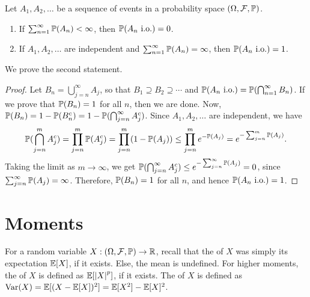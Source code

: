 \begin{lemma}
    Let $A_{1},A_{2},\ldots$ be a sequence of events in a probability space $(\Omega,\mathcal{F},\mathbb{P})$.
    \begin{enumerate}
        \item If $\sum_{n=1}^{\infty} \mathbb{P}(A_{n}) < \infty$, then $\mathbb{P}(A_{n} \text{ i.o.}) = 0$.
        \item If $A_{1},A_{2},\ldots$ are independent and $\sum_{n=1}^{\infty} \mathbb{P}(A_{n}) = \infty$, then $\mathbb{P}(A_{n} \text{ i.o.}) = 1$.
    \end{enumerate}
\end{lemma}
We prove the second statement.
\begin{proof}
    Let $B_{n} = \bigcup_{j=n}^{\infty} A_{j}$, so that $B_{1} \supseteq B_{2} \supseteq \cdots$ and $\mathbb{P}(A_{n} \text{ i.o.}) = \mathbb{P}(\bigcap_{n=1}^{\infty} B_{n})$. If we prove that $\mathbb{P}(B_{n}) = 1$ for all $n$, then we are done. Now, $\mathbb{P}(B_{n}) = 1 - \mathbb{P}(B_{n}^{c}) = 1 - \mathbb{P}(\bigcap_{j=n}^{\infty} A_{j}^{c})$. Since $A_{1},A_{2},\ldots$ are independent, we have
    \begin{align}
        \mathbb{P}(\bigcap_{j=n}^{m} A_{j}^{c}) = \prod_{j=n}^{m} \mathbb{P}(A_{j}^{c}) = \prod_{j=n}^{m} (1 - \mathbb{P}(A_{j})) \leq \prod_{j=n}^{m} e^{-\mathbb{P}(A_{j})} = e^{-\sum_{j=n}^{m} \mathbb{P}(A_{j})}.
    \end{align}
    Taking the limit as $m \to \infty$, we get $\mathbb{P}(\bigcap_{j=n}^{\infty} A_{j}^{c}) \leq e^{-\sum_{j=n}^{\infty} \mathbb{P}(A_{j})} = 0$, since $\sum_{j=n}^{\infty} \mathbb{P}(A_{j}) = \infty$. Therefore, $\mathbb{P}(B_{n}) = 1$ for all $n$, and hence $\mathbb{P}(A_{n} \text{ i.o.}) = 1$.
\end{proof}

\section{Moments}
For a random variable $X:(\Omega,\mathcal{F},\mathbb{P}) \to \mathbb{R}$, recall that the  of $X$ was simply its expectation $\mathbb{E}[X]$, if it exists. Else, the mean is undefined. For higher moments, the  of $X$ is defined as $\mathbb{E}[\left| X \right|^{p}]$, if it exists. The  of $X$ is defined as $\operatorname{Var}(X) = \mathbb{E}[(X - \mathbb{E}[X])^{2}] = \mathbb{E}[X^{2}] - \mathbb{E}[X]^{2}$.

